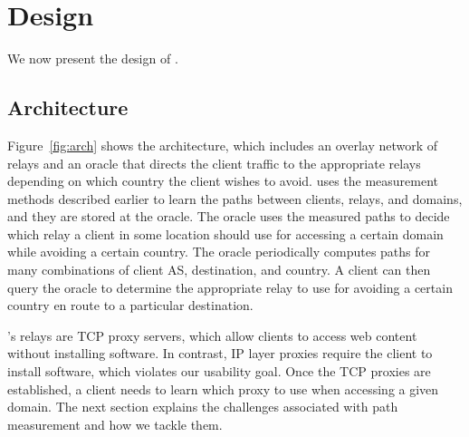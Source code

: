 \section{Design}
\label{system_design}

We now present the design of \system{}.

\subsection{Architecture}

Figure~\ref{fig:arch} shows the \system{} architecture, which includes
an overlay network of relays and an oracle that directs the client
traffic to the appropriate relays depending on which country the client
wishes to avoid.
\system{}  uses 
the measurement methods described earlier to learn the paths between clients, 
relays, and domains, and they are stored at the oracle.  The oracle uses the 
measured paths to decide which relay a client in some location should
use for accessing a certain domain while avoiding a certain country.
The oracle periodically computes paths for many combinations of client AS,
destination, and country.
A client can then query the oracle to determine the appropriate relay to
use for avoiding a certain country en route to a particular destination.

\system{}'s relays are TCP proxy servers, which allow clients to access
web content without installing software.  In contrast, IP layer proxies
require the client to install software, which violates our
usability goal. Once the TCP proxies are established, a
client needs to learn which proxy to use when accessing a given
domain.  The next section explains the challenges associated with path
measurement and how we tackle them.



